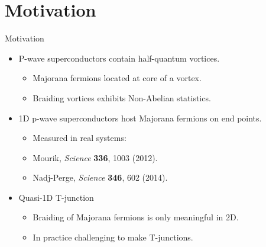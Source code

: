 \documentclass[xcolor=dvipsnames,10pt,aspectratio=169]{beamer}
\newcommand{\MO}{Motivation}
\begin{document}
  \section{\MO}
  \begin{frame}{\MO}{}

    \begin{multicols}{2}

    \begin{itemize}
      \item P-wave superconductors contain half-quantum vortices.
        \begin{itemize}
          \item Majorana fermions located at core of a vortex.
          \item Braiding vortices exhibits Non-Abelian statistics.
        \end{itemize}
      \item 1D p-wave superconductors host Majorana fermions on end points.
        \begin{itemize}
          \item Measured in real systems: 
          \item[] \hspace{0.45em}\scriptsize Mourik, \textit{Science} \textbf{336}, 1003 (2012).
          \item[] \hspace{0.50em}\scriptsize Nadj-Perge, \textit{Science} \textbf{346}, 602 (2014).
        \end{itemize}
      \item Quasi-1D T-junction
        \begin{itemize}
          \item Braiding of Majorana fermions is only meaningful in 2D.
          \item In practice challenging to make T-junctions.
        \end{itemize}
    \end{itemize}

    \begin{figure}
      \end{figure}
    \end{multicols}

  \end{frame}
\end{document}
